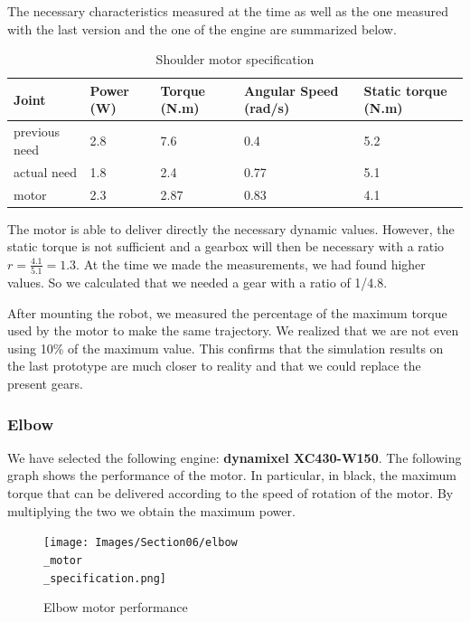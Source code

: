\bigbreak
The necessary characteristics measured at the time as well as the one measured with the last version and the one of the engine are summarized below.
\begin{table}[ht]
    \centering
    \begin{tabular}{|p{1.5cm} | p{2cm} | p{2.5cm}| p{2.7cm} | p{2.7cm} |} 
        \hline
        \textbf{Joint}& \textbf{Power (W)} & \textbf{Torque (N.m)} & \textbf{Angular Speed (rad/s)} & \textbf{Static torque (N.m)}\\ [0.3ex]
        \hline
        previous need & 2.8 & 7.6 & 0.4 & 5.2 \\ 
        \hline
        actual need & 1.8 & 2.4 & 0.77 & 5.1 \\ 
        \hline
        motor & 2.3 & 2.87 & 0.83 & 4.1\\ 
        \hline
    \end{tabular}
    \caption{Shoulder motor specification}
\end{table}
\FloatBarrier
The motor is able to deliver directly the necessary dynamic values. However, the static torque is not sufficient and a gearbox will then be necessary with a ratio $r=\frac{4.1}{5.1}=1.3$. At the time we made the measurements, we had found higher values. So we calculated that we needed a gear with a ratio of 1/4.8.

\bigbreak
After mounting the robot, we measured the percentage of the maximum torque used by the motor to make the same trajectory. We realized that we are not even using 10\% of the maximum value. This confirms that the simulation results on the last prototype are much closer to reality and that we could replace the present gears.

\subsubsection{Elbow}


 We have selected the following engine: \textbf{dynamixel XC430-W150}. The following graph shows the performance of the motor. In particular, in black, the maximum torque that can be delivered according to the speed of rotation of the motor. By multiplying the two we obtain the maximum power.
\begin{figure}[ht]
    \centering
    \texttt{[image: Images/Section06/elbow\\\_motor\\\_specification.png]}
    \caption{Elbow motor performance}
    \label{fig:ElbowMotor}
\end{figure}
\FloatBarrier

